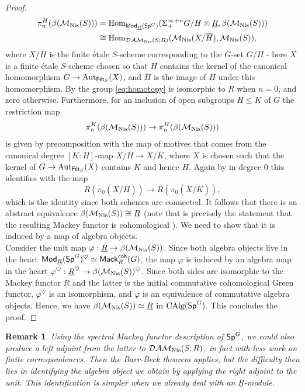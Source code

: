 \documentclass[reqno]{amsart}
\numberwithin{equation}{section}\theoremstyle{thms}
\theoremstyle{defn}
\newtheorem{rem}[equation]{Remark}
\newcommand{\cM}{\mathcal{M}}
\newcommand{\tn}[1]{\textnormal{#1}}
\newcommand{\tsf}[1]{\textsf{\textup{#1}}}
\newcommand{\mcal}[1]{\mathcal{#1}}
\newcommand{\underl}[1]{\underline{#1}}
\newcommand{\overl}[1]{\overline{#1}}
\newcommand{\Hom}{\tn{Hom}}
\newcommand{\calg}{\tn{CAlg}}
\newcommand{\Mod}{\tsf{Mod}}
\newcommand{\specg}{\tsf{Sp}^G}
\newcommand{\cmackgr}{\tsf{Mack}_R^{\tsf{coh}}(G)}
\newcommand{\fets}{\tsf{Fét}_S}
\begin{document}
\begin{proof}
\begin{align}
\pi_n^{H}(\beta(\cM_{\tn{Nis}}(S))) &= \Hom_{\Mod_{\underl{R}}(\specg)}(\Sigma^{\infty +n}_+G/H \otimes \underl{R},\beta(\cM_{\tn{Nis}}(S))) \notag \\
&\cong \Hom_{\mcal{DAM}_{\tn{Nis}}(S;R)}(\cM_{\tn{Nis}}(X/\overl{H}),\cM_{\tn{Nis}}(S)), \label{eq:homotopy}
\end{align}
where $X/\overl{H}$ is the finite étale $S$-scheme corresponding to the $G$-set $G/H$ - here $X$ is a finite étale $S$-scheme chosen so that $H$ contains the kernel of the canonical homomorphism $G \to \tn{Aut}_{\fets}(X)$, and $\overl{H}$ is the image of $H$ under this homomorphism. By \cite[Theorem 11.2.14, Proposition 10.2.5]{cd19} the group \ref{eq:homotopy} is isomorphic to $R$ when $n=0$, and zero otherwise. Furthermore, for an inclusion of open subgroups $H \leq K$ of $G$ the restriction map 
$$\pi_n^{K}(\beta(\cM_{\tn{Nis}}(S))) \to \pi_n^{H}(\beta(\cM_{\tn{Nis}}(S)))$$
is given by precomposition with the map of motives that comes from the canonical degree $[K:H]$-map $X/\overl{H} \to X/\overl{K}$, where $X$ is chosen such that the kernel of $G \to \tn{Aut}_{\fets}(X)$ contains $K$ and hence $H$. Again by \cite[Theorem 11.2.14, Proposition 10.2.5]{cd19} in degree $0$ this identifies with the map 
$$R(\pi_0(X/\overl{H})) \to R(\pi_0(X/\overl{K})),$$
which is the identity since both schemes are connected. It follows that there is an abstract equivalence $\beta(\cM_{\tn{Nis}}(S)) \cong \underl{R}$ (note that \cite[Proposition 11.2.5]{cd19} is precisely the statement that the resulting Mackey functor is cohomological \cite[§16]{tw95}). We need to show that it is induced by a map of algebra objects. \\
Consider the unit map $\varphi: \underl{R} \to \beta(\cM_{\tn{Nis}}(S))$. Since both algebra objects live in the heart $\Mod_{\underl{R}}(\specg)^{\heartsuit} \simeq \cmackgr$, the map $\varphi$ is induced by an algebra map in the heart $\varphi^{\heartsuit}: \underl{R}^\heartsuit \to \beta(\cM_{\tn{Nis}}(S))^\heartsuit$. Since both sides are isomorphic to the Mackey functor $\underl{R}$ and the latter is the initial commutative cohomological Green functor, $\varphi^\heartsuit$ is an isomorphism, and $\varphi$ is an equivalence of commutative algebra objects. Hence, we have $\beta(\cM_{\tn{Nis}}(S)) \simeq \underl{R}$ in $\calg(\specg)$. This concludes the proof.
\end{proof}

\begin{rem}
Using the spectral Mackey functor description of $\specg$, we could also produce a left adjoint from the latter to $\mcal{DAM}_{\tn{Nis}}(S;R)$, in fact with less work on finite correspondences. Then the Barr-Beck theorem applies, but the difficulty then lies in identifying the algebra object we obtain by applying the right adjoint to the unit. This identification is simpler when we already deal with an $\underl{R}$-module.
\end{rem}
\end{document}
